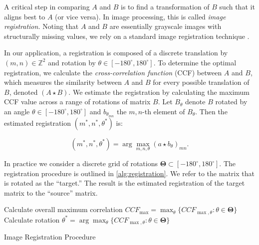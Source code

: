 \documentclass[preprint]{JASA}
\begin{document}
A critical step in comparing \(A\) and \(B\) is to find a transformation
of \(B\) such that it aligns best to \(A\) (or vice versa). In image
processing, this is called \emph{image registration.} Noting that \(A\)
and \(B\) are essentially grayscale images with structurally missing
values, we rely on a standard image registration technique
\citep{Brown1992}.

In our application, a registration is composed of a discrete translation
by \((m,n) \in \mathbb{Z}^2\) and rotation by
\(\theta \in [-180^\circ,180^\circ]\). To determine the optimal
registration, we calculate the \emph{cross-correlation function} (CCF)
between \(A\) and \(B\), which measures the similarity between \(A\) and
\(B\) for every possible translation of \(B\), denoted \((A \star B)\).
We estimate the registration by calculating the maximum CCF value across
a range of rotations of matrix \(B\). Let \(B_\theta\) denote \(B\)
rotated by an angle \(\theta \in [-180^\circ,180^\circ]\) and
\(b_{\theta_{mn}}\) the \(m,n\)-th element of \(B_\theta\). Then the
estimated registration \((m^*,n^*,\theta^*)\) is:

\[
(m^*,n^*,\theta^*) = \arg \max_{m,n,\theta} (a \star b_\theta)_{mn}.
\]

In practice we consider a discrete grid of rotations
\(\pmb{\Theta} \subset [-180^\circ,180^\circ]\). The registration
procedure is outlined in \autoref{alg:registration}. We refer to the
matrix that is rotated as the ``target.'' The result is the estimated
registration of the target matrix to the ``source'' matrix.

\begin{algorithm}[htbp]
Calculate overall maximum correlation $CCF_{\max} = \max_{\theta} \{CCF_{\max,\theta} : \theta \in \pmb{\Theta}\}$\;
Calculate rotation $\theta^* = \arg \max_{\theta} \{CCF_{\max,\theta} : \theta \in \pmb{\Theta}\}$\;
\caption{Image Registration Procedure}
\label{alg:registration}
\end{algorithm}
\end{document}
